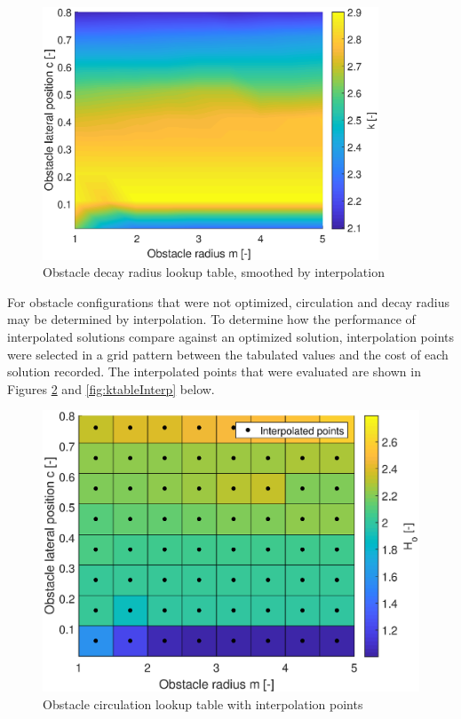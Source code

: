\documentclass[numbered,pdftex]{ohio-etd}
\begin{document}
\begin{figure}[H]
	\centering
	\includegraphics[width=10cm]{PaperFigures/Methods/LookupTable/kTableHeat}
	\caption{Obstacle decay radius lookup table, smoothed by interpolation}
	\label{fig:ktable}
\end{figure}

For obstacle configurations that were not optimized, circulation and decay radius may be determined by interpolation. To determine how the performance of interpolated solutions compare against an optimized solution, interpolation points were selected in a grid pattern between the tabulated values and the cost of each solution recorded. The interpolated points that were evaluated are shown in Figures \ref{fig:htableInterp} and \ref{fig:ktableInterp} below. 


\begin{figure}[H]
	\centering
	\includegraphics[width=12cm]{PaperFigures/Methods/LookupTable/hTableInterpolationPoints}
	\caption{Obstacle circulation lookup table with interpolation points}
	\label{fig:htableInterp}
\end{figure}
\end{document}
